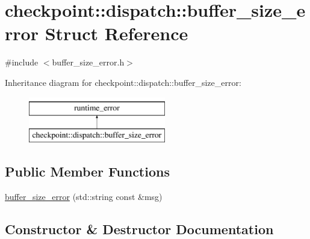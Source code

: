 \hypertarget{structcheckpoint_1_1dispatch_1_1buffer__size__error}{}\section{checkpoint\+:\+:dispatch\+:\+:buffer\+\_\+size\+\_\+error Struct Reference}
\label{structcheckpoint_1_1dispatch_1_1buffer__size__error}


{\ttfamily \#include $<$buffer\+\_\+size\+\_\+error.\+h$>$}

Inheritance diagram for checkpoint\+:\+:dispatch\+:\+:buffer\+\_\+size\+\_\+error\+:\begin{figure}[H]
\begin{center}
\leavevmode
\includegraphics[height=2.000000cm]{structcheckpoint_1_1dispatch_1_1buffer__size__error}
\end{center}
\end{figure}
\subsection*{Public Member Functions}
\begin{DoxyCompactItemize}
\item 
\hyperlink{structcheckpoint_1_1dispatch_1_1buffer__size__error_ab4fc5f36aa64da80dd40a3e223c90a46}{buffer\+\_\+size\+\_\+error} (std\+::string const \&msg)
\end{DoxyCompactItemize}


\subsection{Constructor \& Destructor Documentation}
\mbox{\label{structcheckpoint_1_1dispatch_1_1buffer__size__error_ab4fc5f36aa64da80dd40a3e223c90a46}} 
